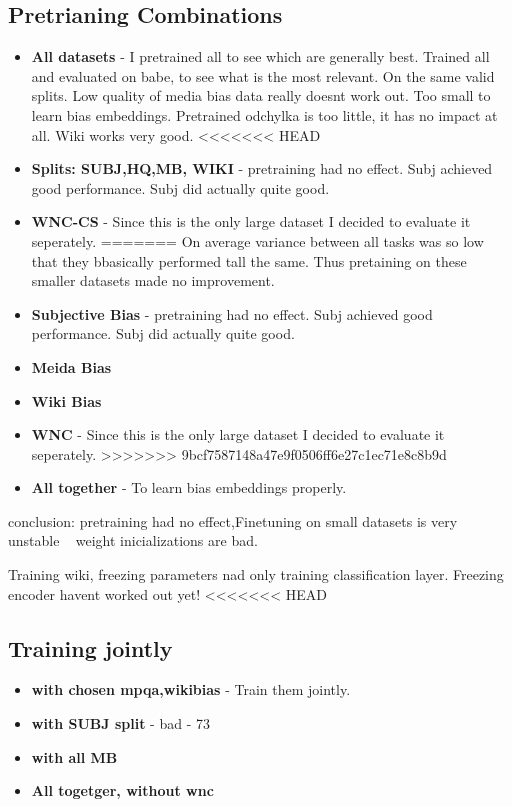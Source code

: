  \subsection{Pretrianing Combinations}
 \begin{itemize}
     \item \textbf{All datasets} -  I pretrained all to see which are generally best. Trained all and evaluated on babe, to see what is the most relevant. On the same valid splits. Low quality of media bias data really doesnt work out. Too small to learn bias embeddings.
     Pretrained odchylka is too little, it has no impact at all. Wiki works very good.
<<<<<<< HEAD
     \item \textbf{Splits: SUBJ,HQ,MB, WIKI} - pretraining had no effect. Subj achieved good performance. Subj did actually quite good.
     \item \textbf{WNC-CS} - Since this is the only large dataset I decided to evaluate it seperately.
=======
     On average variance between all tasks was so low that they bbasically performed tall the same. Thus pretaining on these smaller datasets made no improvement.
     \item \textbf{Subjective Bias} - pretraining had no effect. Subj achieved good performance. Subj did actually quite good.
     \item \textbf{Meida Bias}
     \item \textbf{Wiki Bias} 
     \item \textbf{WNC} - Since this is the only large dataset I decided to evaluate it seperately.
>>>>>>> 9bcf7587148a47e9f0506ff6e27c1ec71e8c8b9d
     \item \textbf{All together} - To learn bias embeddings properly.
 \end{itemize}
 
 conclusion: pretraining had no effect,Finetuning on small datasets is very unstable ~ weight inicializations are bad.
 
 Training wiki, freezing parameters nad only training classification layer.
 Freezing encoder havent worked out yet!
<<<<<<< HEAD
\subsection{Training jointly}
\begin{itemize}
    \item \textbf{with chosen mpqa,wikibias} - Train them jointly.
    \item \textbf{with SUBJ split} - bad - 73
    \item \textbf{with all MB}
    \item \textbf{All togetger, without wnc}
\end{itemize}

